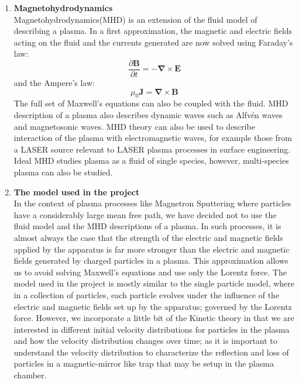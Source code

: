 \documentclass[12pt]{article}
\begin{document}
\begin{enumerate}
		\item \textbf{Magnetohydrodynamics} \\
		Magnetohydrodynamics(MHD) is an extension of the fluid model of describing a plasma. In a first approximation, the magnetic and electric fields acting on the fluid and the currents generated are now solved using Faraday's law: \\
		$$\frac{\partial \mathbf{B}}{\partial t} = - \boldsymbol{\nabla} \times \mathbf{E}$$
		and the Ampere's law: \\
		$$\mu_{0} \mathbf{J} = \boldsymbol{\nabla} \times \mathbf{B}$$
		The full set of Maxwell's equations can also be coupled with the fluid. MHD description of a plasma also describes dynamic waves such as Alfv\'en waves and magnetosonic waves. MHD theory can also be used to describe interaction of the plasma with electromagnetic waves, for example those from a LASER source relevant to LASER plasma processes in surface engineering. Ideal MHD studies plasma as a fluid of single species, however, multi-species plasma can also be studied. \\
		
		\item \textbf{The model used in the project} \\
		In the context of plasma processes like Magnetron Sputtering where particles have a considerably large mean free path, we have decided not to use the fluid model and the MHD descriptions of a plasma. In such processes, it is almost always the case that the strength of the electric and magnetic fields applied by the apparatus is far more stronger than the electric and magnetic fields generated by charged particles in a plasma. This approximation allows us to avoid solving Maxwell's equations and use only the Lorentz force. The model used in the project is mostly similar to the single particle model, where in a collection of particles, each particle evolves under the influence of the electric and magnetic fields set up by the apparatus; governed by the Lorentz force. However, we incorporate a little bit of the Kinetic theory in that we are interested in different initial velocity distributions for particles in the plasma and how the velocity distribution changes over time; as it is important to understand the velocity distribution to characterize the reflection and loss of particles in a magnetic-mirror like trap that may be setup in the plasma chamber.  
		
	\end{enumerate}
	
\end{document}
